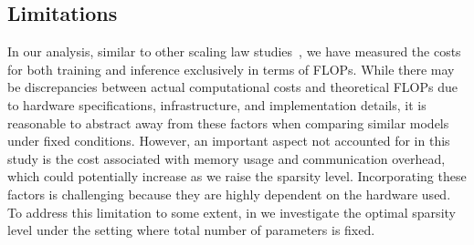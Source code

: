 




\subsection{Limitations}
In our analysis, similar to other scaling law studies~\citep{kaplan_scale, hoffmann2022training}, we have measured the costs for both training and inference exclusively in terms of FLOPs. While there may be discrepancies between actual computational costs and theoretical FLOPs due to hardware specifications, infrastructure, and implementation details, it is reasonable to abstract away from these factors when comparing similar models under fixed conditions. However, an important aspect not accounted for in this study is the cost associated with memory usage and communication overhead, which could potentially increase as we raise the sparsity level. Incorporating these factors is challenging because they are highly dependent on the hardware used. 
To address this limitation to some extent, in  we investigate the optimal sparsity level under the setting where total number of parameters is fixed.

